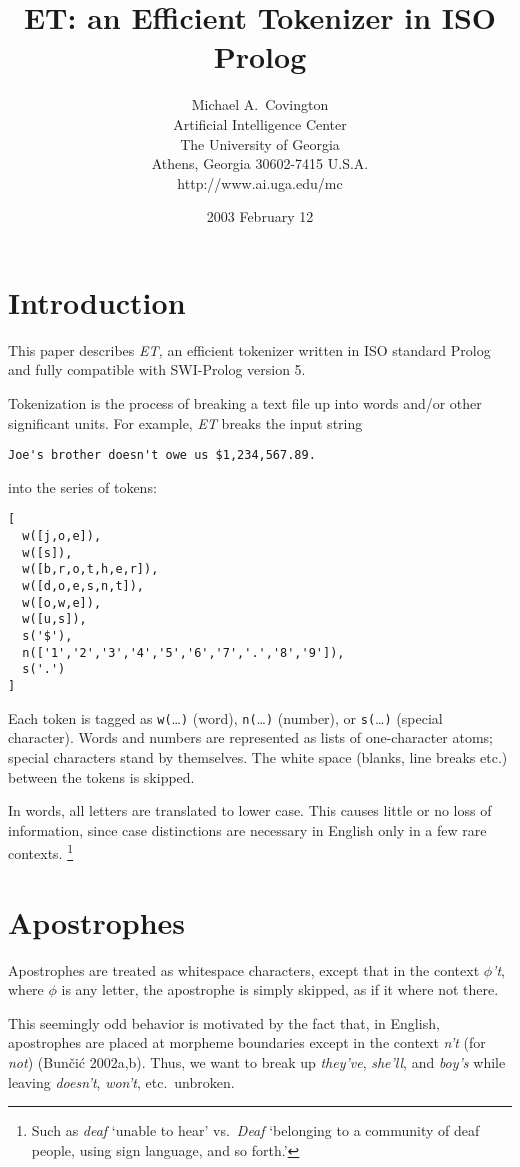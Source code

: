 \documentclass[12pt]{article}
\title{\bf ET: an Efficient Tokenizer in ISO Prolog}
\author{Michael A.\ Covington\\
        Artificial Intelligence Center\\
        The University of Georgia \\
        Athens, Georgia 30602-7415 U.S.A.\\
        http://www.ai.uga.edu/mc}
\date{2003 February 12}
\begin{document}
\maketitle

\section{Introduction}

This paper describes \emph{ET,} an efficient tokenizer written in ISO standard Prolog and fully
compatible with SWI-Prolog version 5.

Tokenization is the process of breaking a text file up into words and/or other
significant units.
For example, \emph{ET} breaks the input string
\begin{verbatim}
Joe's brother doesn't owe us $1,234,567.89.
\end{verbatim}
into the series of tokens:
\begin{verbatim}
[ 
  w([j,o,e]),
  w([s]),
  w([b,r,o,t,h,e,r]),
  w([d,o,e,s,n,t]),
  w([o,w,e]),
  w([u,s]),
  s('$'),
  n(['1','2','3','4','5','6','7','.','8','9']),
  s('.')
]
\end{verbatim}
Each token is tagged as \verb"w("\dots\verb")" (word),
\verb"n("\dots\verb")" (number), or
\verb"s("\dots\verb")" (special character).
Words and numbers are represented as lists of one-character atoms;
special characters stand by themselves.
The white space (blanks, line breaks etc.) between the tokens is
skipped.

In words, all letters are translated to lower case.
This causes little or no loss of information, since case distinctions
are necessary in English only in a few rare contexts.%
\footnote{Such as \emph{deaf} `unable to hear' vs.\ \emph{Deaf} `belonging
to a community of deaf people, using sign language, and so forth.'}

\section{Apostrophes}

Apostrophes are treated as whitespace characters, except that 
in the context \emph{$\phi$'t}, where $\phi$ is any letter, the
apostrophe is simply skipped, as if it where not there.

This seemingly odd behavior is motivated by the fact that,
in English, apostrophes are placed at morpheme boundaries except
in the context \emph{n't} (for \emph{not})
(Bun\v{c}i\'{c} 2002a,b).
Thus, we want to break up \emph{they've}, \emph{she'll}, and \emph{boy's}
while leaving \emph{doesn't}, \emph{won't}, etc.\ unbroken.
\end{document}
